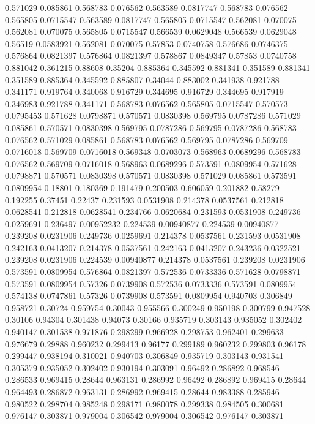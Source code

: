 0.571029 0.085861
0.568783 0.076562
0.563589 0.0817747
0.568783 0.076562
0.565805 0.0715547
0.563589 0.0817747
0.565805 0.0715547
0.562081 0.070075
0.562081 0.070075
0.565805 0.0715547
0.566539 0.0629048
0.566539 0.0629048
0.56519 0.0583921
0.562081 0.070075
0.57853 0.0740758
0.576686 0.0746375
0.576864 0.0821397
0.576864 0.0821397
0.578867 0.0849347
0.57853 0.0740758
0.881042 0.361215
0.88608 0.35204
0.885364 0.345592
0.881341 0.351589
0.881341 0.351589
0.885364 0.345592
0.885807 0.34044
0.883002 0.341938
0.921788 0.341171
0.919764 0.340068
0.916729 0.344695
0.916729 0.344695
0.917919 0.346983
0.921788 0.341171
0.568783 0.076562
0.565805 0.0715547
0.570573 0.0795453
0.571628 0.0798871
0.570571 0.0830398
0.569795 0.0787286
0.571029 0.085861
0.570571 0.0830398
0.569795 0.0787286
0.569795 0.0787286
0.568783 0.076562
0.571029 0.085861
0.568783 0.076562
0.569795 0.0787286
0.569709 0.0716018
0.569709 0.0716018
0.569348 0.0703073
0.568963 0.0689296
0.568783 0.076562
0.569709 0.0716018
0.568963 0.0689296
0.573591 0.0809954
0.571628 0.0798871
0.570571 0.0830398
0.570571 0.0830398
0.571029 0.085861
0.573591 0.0809954
0.18801 0.180369
0.191479 0.200503
0.606059 0.201882
0.58279 0.192255
0.37451 0.22437
0.231593 0.0531908
0.214378 0.0537561
0.212818 0.0628541
0.212818 0.0628541
0.234766 0.0620684
0.231593 0.0531908
0.249736 0.0259691
0.236497 0.00952232
0.224539 0.00940877
0.224539 0.00940877
0.239208 0.0231906
0.249736 0.0259691
0.214378 0.0537561
0.231593 0.0531908
0.242163 0.0413207
0.214378 0.0537561
0.242163 0.0413207
0.243236 0.0322521
0.239208 0.0231906
0.224539 0.00940877
0.214378 0.0537561
0.239208 0.0231906
0.573591 0.0809954
0.576864 0.0821397
0.572536 0.0733336
0.571628 0.0798871
0.573591 0.0809954
0.57326 0.0739908
0.572536 0.0733336
0.573591 0.0809954
0.574138 0.0747861
0.57326 0.0739908
0.573591 0.0809954
0.940703 0.306849
0.958721 0.30724
0.959754 0.30043
0.955566 0.300249
0.950198 0.300799
0.947528 0.30106
0.94304 0.301438
0.94073 0.30166
0.935719 0.303143
0.935052 0.302402
0.940147 0.301538
0.971876 0.298299
0.966928 0.298753
0.962401 0.299633
0.976679 0.29888
0.960232 0.299413
0.96177 0.299189
0.960232 0.299803
0.96178 0.299447
0.938194 0.310021
0.940703 0.306849
0.935719 0.303143
0.931541 0.305379
0.935052 0.302402
0.930194 0.303091
0.96492 0.286892
0.968546 0.286533
0.969415 0.28644
0.963131 0.286992
0.96492 0.286892
0.969415 0.28644
0.964493 0.286872
0.963131 0.286992
0.969415 0.28644
0.983388 0.285946
0.980522 0.298704
0.985248 0.298171
0.980078 0.299338
0.984505 0.300681
0.976147 0.303871
0.979004 0.306542
0.979004 0.306542
0.976147 0.303871
